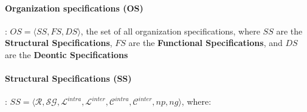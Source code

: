 \documentclass[runningheads]{llncs}
\begin{document}
\paragraph{\textbf{Organization specifications (OS)}}: $OS = \langle SS, FS, DS \rangle$, the set of all organization specifications, where $SS$ are the \textbf{Structural Specifications}, $FS$ are the \textbf{Functional Specifications}, and $DS$ are the \textbf{Deontic Specifications}

\paragraph{\textbf{Structural Specifications (SS)}}: $SS = \langle \mathcal{R}, \mathcal{SG}, \mathcal{L}^{intra}, \mathcal{L}^{inter}, \mathcal{C}^{intra}, \mathcal{C}^{inter}, np, ng \rangle$, where:
\end{document}

